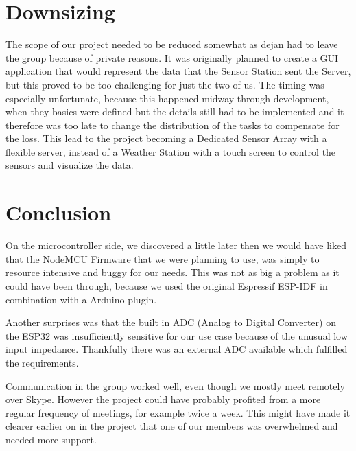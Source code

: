\section{Downsizing}
The scope of our project needed to be reduced somewhat as dejan had to leave the group because of private reasons.
It was originally planned to create a GUI application that would represent the data that the Sensor Station sent the Server, but this proved to be too challenging for just the two of us.
The timing was especially unfortunate, because this happened midway through development, when they basics were defined but the details still had to be implemented and it therefore was too late to change the distribution of the tasks to compensate for the loss.
This lead to the project becoming a Dedicated Sensor Array with a flexible server, instead of a Weather Station with a touch screen to control the sensors and visualize the data.

\section{Conclusion}
On the microcontroller side, we discovered a little later then we would have liked that the NodeMCU Firmware that we were planning to use, was simply to resource intensive and buggy for our needs. This was not as big a problem as it could have been through, because we used the original Espressif ESP-IDF in combination with a Arduino plugin.

Another surprises was that the built in ADC (Analog to Digital Converter) on the ESP32 was insufficiently sensitive for our use case because of the unusual low input impedance. Thankfully there was an external ADC available which fulfilled the requirements.

Communication in the group worked well, even though we mostly meet remotely over Skype. However the project could have probably profited from a more regular frequency of meetings, for example twice a week. This might have made it clearer earlier on in the project that one of our members was overwhelmed and needed more support.
\newpage
